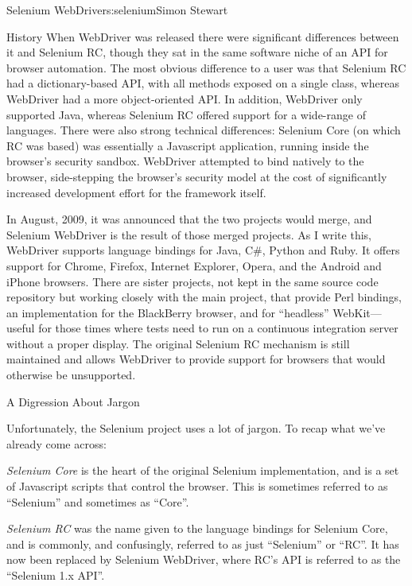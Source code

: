\begin{aosachapter}{Selenium WebDriver}{s:selenium}{Simon Stewart}
\begin{aosasect1}{History}
When WebDriver was released there were significant differences between
it and Selenium RC, though they sat in the same software niche of an
API for browser automation.  The most obvious difference to a user was
that Selenium RC had a dictionary-based API, with all methods exposed
on a single class, whereas WebDriver had a more object-oriented API\@.
In addition, WebDriver only supported Java, whereas Selenium RC
offered support for a wide-range of languages.  There were also strong
technical differences: Selenium Core (on which RC was based) was
essentially a Javascript application, running inside the browser's
security sandbox. WebDriver attempted to bind natively to the browser,
side-stepping the browser's security model at the cost of
significantly increased development effort for the framework itself.

In August, 2009, it was announced that the two projects would merge,
and Selenium WebDriver is the result of those merged projects.
As I write this, WebDriver supports language bindings for Java, C\#,
Python and Ruby. It offers support for Chrome, Firefox, Internet
Explorer, Opera, and the Android and iPhone browsers. There are sister
projects, not kept in the same source code repository but working
closely with the main project, that provide Perl bindings, an
implementation for the BlackBerry browser, and for ``headless''
WebKit---useful for those times where tests need to run on a
continuous integration server without a proper display. The original
Selenium RC mechanism is still maintained and allows WebDriver to
provide support for browsers that would otherwise be unsupported.

\end{aosasect1}

\begin{aosasect1}{A Digression About Jargon}

Unfortunately, the Selenium project uses a lot of jargon.  To recap
what we've already come across:

\begin{aosaitemize}

  \item \emph{Selenium Core} is the heart of the original Selenium implementation,
  and is a set of Javascript scripts that control the browser. This is
  sometimes referred to as ``Selenium'' and sometimes as ``Core''.

  \item \emph{Selenium RC} was the name given to the language bindings for Selenium
  Core, and is commonly, and confusingly, referred to as just
  ``Selenium'' or ``RC''.  It has now been replaced by Selenium
  WebDriver, where RC's API is referred to as the ``Selenium 1.x API''.


\end{aosaitemize}
\end{aosasect1}
\end{aosachapter}
